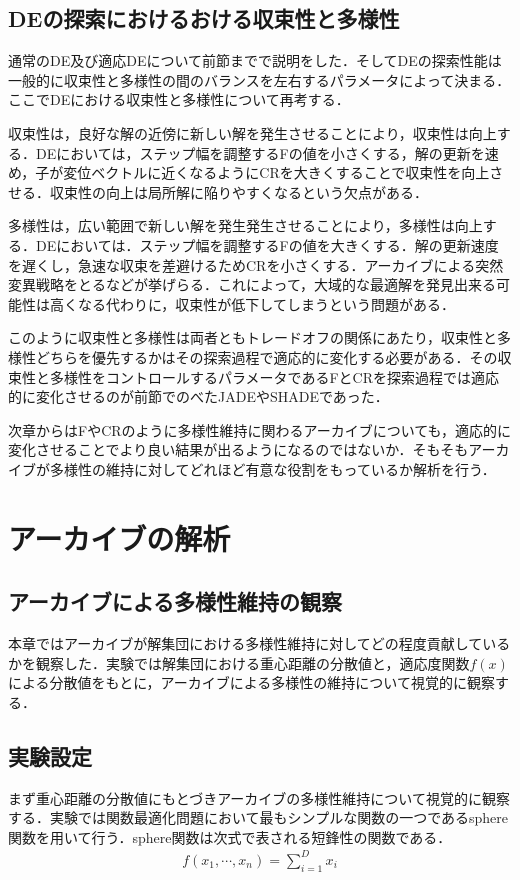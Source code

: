 \documentclass[a4paper,11pt,oneside,openany]{jsbook}
\begin{document}
\section{DEの探索におけるおける収束性と多様性}
通常のDE及び適応DEについて前節までで説明をした．そしてDEの探索性能は一般的に収束性と多様性の間のバランスを左右するパラメータによって決まる．ここでDEにおける収束性と多様性について再考する．

収束性は，良好な解の近傍に新しい解を発生させることにより，収束性は向上する．DEにおいては，ステップ幅を調整するFの値を小さくする，解の更新を速め，子が変位ベクトルに近くなるようにCRを大きくすることで収束性を向上させる．収束性の向上は局所解に陥りやすくなるという欠点がある．

多様性は，広い範囲で新しい解を発生発生させることにより，多様性は向上する．DEにおいては．ステップ幅を調整するFの値を大きくする．解の更新速度を遅くし，急速な収束を差避けるためCRを小さくする．アーカイブによる突然変異戦略をとるなどが挙げらる．これによって，大域的な最適解を発見出来る可能性は高くなる代わりに，収束性が低下してしまうという問題がある．

このように収束性と多様性は両者ともトレードオフの関係にあたり，収束性と多様性どちらを優先するかはその探索過程で適応的に変化する必要がある．その収束性と多様性をコントロールするパラメータであるFとCRを探索過程では適応的に変化させるのが前節でのべたJADEやSHADEであった．

次章からはFやCRのように多様性維持に関わるアーカイブについても，適応的に変化させることでより良い結果が出るようになるのではないか．そもそもアーカイブが多様性の維持に対してどれほど有意な役割をもっているか解析を行う．


\chapter{アーカイブの解析}
\section{アーカイブによる多様性維持の観察}
本章ではアーカイブが解集団における多様性維持に対してどの程度貢献しているかを観察した．実験では解集団における重心距離の分散値と，適応度関数$f(x)$による分散値をもとに，アーカイブによる多様性の維持について視覚的に観察する．

\section{実験設定}
まず重心距離の分散値にもとづきアーカイブの多様性維持について視覚的に観察する．実験では関数最適化問題において最もシンプルな関数の一つであるsphere関数を用いて行う．sphere関数は次式で表される短鋒性の関数である．
\begin{eqnarray}
  f(x_1,\cdots,x_n) = \sum_{i=1}^D x_i
\end{eqnarray}
\end{document}
